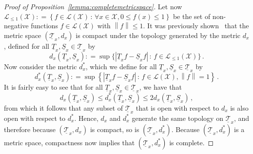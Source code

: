 \documentclass[10pt]{paper}
\theoremstyle{definition}
\newcommand{\states}{\mathcal{X}}
\newcommand{\lt}{\underline{T}}
\newcommand{\gambles}{\mathcal{L}}
\newcommand{\gamblesX}{\gambles(\states)}
\newcommand{\norm}[1]{\left\lVert #1 \right\rVert}
\newcommand{\abs}[1]{\left\vert #1 \right\vert}
\newcommand{\coloneqq}{:\!=}
\begin{document}
\begin{proof}[Proof of Proposition~\ref{lemma:completemetricspace}]
Let now $\gambles_{\leq1}(\states)\coloneqq\left\{f\in\gamblesX\,:\,\forall x\in\states, 0\leq f(x)\leq 1\right\}$ be the set of non-negative functions $f\in\gamblesX$ with $\norm{f}\leq 1$. It was previously shown~\cite{DeBock:2015ck} that the metric space $(\underline{\mathcal{T}}_x,d_x)$ is compact under the topology generated by the metric $d_x$, defined for all $\lt_x,\underline{S}_x\in\underline{\mathcal{T}}_x$ by
\begin{equation*}
d_x(\lt_x,\underline{S}_x) \coloneqq \sup\bigl\{ \abs{\lt_xf - \underline{S}_xf} \,:\,f\in\gambles_{\leq1}(\states) \bigr\}\,.
\end{equation*}
Now consider the metric $d_x^*$, which we define for all $\lt_x,\underline{S}_x\in\underline{\mathcal{T}}_x$ by
\begin{equation*}
d_x^*(\lt_x,\underline{S}_x) \coloneqq \sup\left\{ \abs{\lt_xf - \underline{S}_xf}\,:\, f\in\gamblesX, \norm{f}=1\right\}\,.
\end{equation*}
It is fairly easy to see that for all $\lt_x,\underline{S}_x\in\underline{\mathcal{T}}_x$, we have that
\begin{equation*}
d_x(\lt_x,\underline{S}_x) \leq d_x^*(\lt_x,\underline{S}_x) \leq 2d_x(\lt_x,\underline{S}_x)\,,
\end{equation*}
from which it follows that any subset of $\underline{\mathcal{T}}_x$ that is open with respect to $d_x$ is also open with respect to $d_x^*$. Hence, $d_x$ and $d_x^*$ generate the same topology on $\underline{\mathcal{T}}_x$, and therefore because $(\underline{\mathcal{T}}_x, d_x)$ is compact, so is $(\underline{\mathcal{T}}_x,d_x^*)$. Because $(\underline{\mathcal{T}}_x,d_x^*)$ is a metric space, compactness now implies that $(\underline{\mathcal{T}}_x,d_x^*)$ is complete.


\end{proof}
\end{document}
